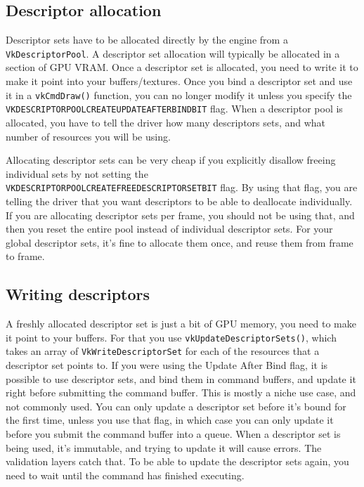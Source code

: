 \documentclass[12pt]{article}
\begin{document}
	\subsection{Descriptor allocation}
	Descriptor sets have to be allocated directly by the engine from a \texttt{VkDescriptorPool}. A descriptor set allocation will typically be allocated in a section of GPU VRAM. Once a descriptor set is allocated, you need to write it to make it point into your buffers/textures. Once you bind a descriptor set and use it in a \texttt{vkCmdDraw()} function, you can no longer modify it unless you specify the \texttt{VK\textunderscore{}DESCRIPTOR\textunderscore{}POOL\textunderscore{}CREATE\textunderscore{}UPDATE\textunderscore{}AFTER\textunderscore{}BIND\textunderscore{}BIT} flag. When a descriptor pool is allocated, you have to tell the driver how many descriptors sets, and what number of resources you will be using.\newline

	Allocating descriptor sets can be very cheap if you explicitly disallow freeing individual sets by not setting the \texttt{VK\textunderscore{}DESCRIPTOR\textunderscore{}POOL\textunderscore{}CREATE\textunderscore{}FREE\textunderscore{}DESCRIPTOR\textunderscore{}SET\textunderscore{}BIT} flag. By using that flag, you are telling the driver that you want descriptors to be able to deallocate individually. If you are allocating descriptor sets per frame, you should not be using that, and then you reset the entire pool instead of individual descriptor sets. For your global descriptor sets, it's fine to allocate them once, and reuse them from frame to frame.

	\subsection{Writing descriptors}
	A freshly allocated descriptor set is just a bit of GPU memory, you need to make it point to your buffers. For that you use \texttt{vkUpdateDescriptorSets()}, which takes an array of \texttt{VkWriteDescriptorSet} for each of the resources that a descriptor set points to. If you were using the Update After Bind flag, it is possible to use descriptor sets, and bind them in command buffers, and update it right before submitting the command buffer. This is mostly a niche use case, and not commonly used. You can only update a descriptor set before it's bound for the first time, unless you use that flag, in which case you can only update it before you submit the command buffer into a queue. When a descriptor set is being used, it's immutable, and trying to update it will cause errors. The validation layers catch that. To be able to update the descriptor sets again, you need to wait until the command has finished executing.
\end{document}
